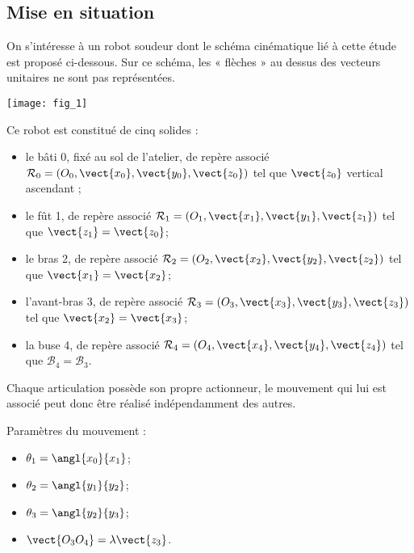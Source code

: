 \setcounter{numques}{0}
\ifprof
\else
\begin{multicols}{2}
\fi


\subsection*{Mise en situation}

On s’intéresse à un robot soudeur dont le schéma cinématique lié à cette étude est proposé ci-dessous.
Sur ce schéma, les « flèches » au dessus des vecteurs unitaires ne sont pas représentées.


\begin{center}
\texttt{[image: fig\_1]}
\end{center}

Ce robot est constitué de cinq solides :
\begin{itemize}
\item le bâti 0, fixé au sol de l’atelier, de repère associé $\mathcal{R}_0=\left(O_0,\vect{x_0},\vect{y_0},\vect{z_0}\right)$ tel que $\vect{z_0}$ vertical ascendant ;
\item le fût 1, de repère associé $\mathcal{R}_1=\left(O_1,\vect{x_1},\vect{y_1},\vect{z_1}\right)$ tel que $\vect{z_1}  =\vect{z_0}$;
\item le bras 2, de repère associé $\mathcal{R}_2=\left(O_2,\vect{x_2},\vect{y_2},\vect{z_2}\right)$ tel que $\vect{x_1}  =\vect{x_2}$;
\item l’avant-bras 3, de repère associé $\mathcal{R}_3=\left(O_3,\vect{x_3},\vect{y_3},\vect{z_3}\right)$ tel que $\vect{x_2}  =\vect{x_3}$;
\item la buse 4, de repère associé $\mathcal{R}_4=\left(O_4,\vect{x_4},\vect{y_4},\vect{z_4}\right)$ tel que $\mathcal{B}_4  =\mathcal{B}_3$.
\end{itemize}


Chaque articulation possède son propre actionneur, le mouvement qui lui est associé peut donc être réalisé
indépendamment des autres.

\begin{multicols}{2}
\noindent Paramètres du mouvement :
\begin{itemize}
\item $\theta_1 = \angl{x_0}{x_1}$;
\item $\theta_2 = \angl{y_1}{y_2}$;
\item $\theta_3 = \angl{y_2}{y_3}$;
\item $\vect{O_3O_4} = \lambda \vect{z_3}$.
\end{itemize}


\end{multicols}
\end{multicols}
